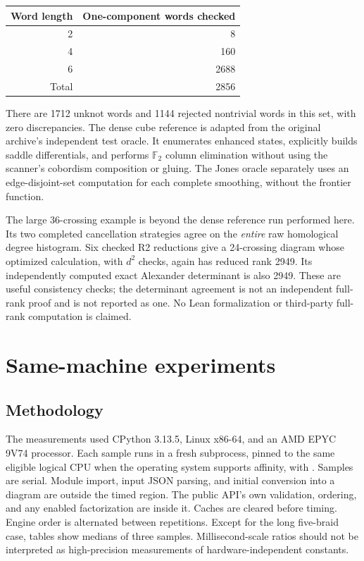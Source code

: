 \documentclass[11pt,letterpaper]{article}
\theoremstyle{definition}\newtheorem{definition}[theorem]{Definition}
\theoremstyle{remark}\newtheorem{remark}[theorem]{Remark}
\newcommand{\F}{\mathbb F}
\newcommand{\code}[1]{\texttt{\detokenize{#1}}}
\begin{document}
\begin{center}
\begin{tabular}{rr}
\toprule
Word length & One-component words checked\\
\midrule
2 & 8\\
4 & 160\\
6 & 2688\\
\midrule
Total & 2856\\
\bottomrule
\end{tabular}
\end{center}
There are 1712 unknot words and 1144 rejected nontrivial words in this set, with
zero discrepancies. The dense cube reference is adapted from the original
archive's independent test oracle. It enumerates enhanced states, explicitly
builds saddle differentials, and performs $\F_2$ column elimination without
using the scanner's cobordism composition or gluing. The Jones oracle separately
uses an edge-disjoint-set computation for each complete smoothing, without the
frontier \code{glue} function.

The large 36-crossing example is beyond the dense reference run performed here.
Its two completed cancellation strategies agree on the \emph{entire} raw
homological degree histogram. Six checked R2 reductions give a 24-crossing
diagram whose optimized calculation, with $d^2$ checks, again has reduced rank
2949. Its independently computed exact Alexander determinant is also 2949.
These are useful consistency checks; the determinant agreement is not an
independent full-rank proof and is not reported as one. No Lean formalization
or third-party full-rank computation is claimed.

\section{Same-machine experiments}
\label{sec:experiments}

\subsection{Methodology}

The measurements used CPython 3.13.5, Linux x86-64, and an AMD EPYC 9V74 processor.
Each sample runs in a fresh subprocess, pinned to the same eligible logical CPU
when the operating system supports affinity, with \code{PYTHONHASHSEED=0}.
Samples are serial. Module import, input JSON parsing, and initial conversion
into a diagram are outside the timed region. The public API's own validation,
ordering, and any enabled factorization are inside it. Caches are cleared before
timing. Engine order is alternated between repetitions. Except for the long
five-braid case, tables show medians of three samples. Millisecond-scale ratios
should not be interpreted as high-precision measurements of hardware-independent
constants.
\end{document}
